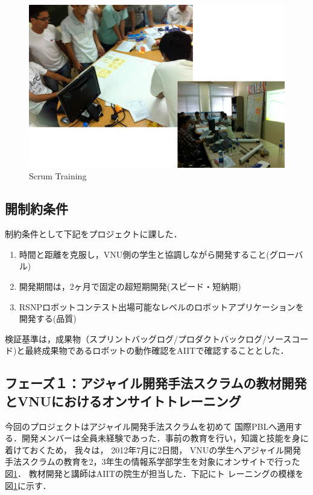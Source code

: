 \documentclass[a4j, 12Q, twocolumn, twoside]{jsarticle}
\begin{document}
\begin{figure}[htb]
  \begin{center}
    \includegraphics[width=\columnwidth]{./figures/training.png}
    \caption{Scrum Training}
    \label{fig:training}
  \end{center}
\end{figure}

\subsection{開制約条件}
制約条件として下記をプロジェクトに課した．
\begin{enumerate}
\item 時間と距離を克服し，VNU側の学生と協調しながら開発すること(グローバル)
\item 開発期間は，2ヶ月で固定の超短期開発(スピード・短納期)
\item RSNPロボットコンテスト出場可能なレベルのロボットアプリケーションを開発する(品質)
\end{enumerate}

検証基準は，成果物（スプリントバッグログ/プロダクトバックログ/ソースコード)と最終成果物であるロボットの動作確認をAIITで確認することとした．

\subsection{フェーズ１：アジャイル開発手法スクラムの教材開発とVNUにおけるオンサイトトレーニング}
今回のプロジェクトはアジャイル開発手法スクラムを初めて
国際PBLへ適用する．開発メンバーは全員未経験であった．事前の教育を行い，知識と技能を身に着けておくため，
我々は， 2012年7月に2日間，
VNUの学生へアジャイル開発手法スクラムの教育を2，3年生の情報系学部学生を対象にオンサイトで行った
図\ref{fig:training}． 教材開発と講師はAIITの院生が担当した．下記にト
レーニングの模様を図\ref{fig:training}に示す．
\end{document}
